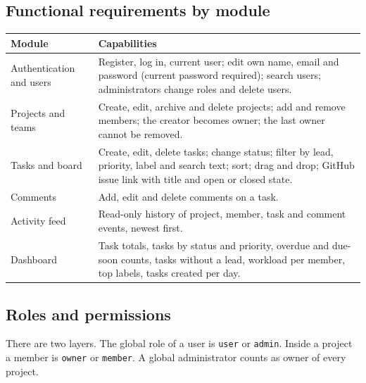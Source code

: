 \documentclass[11pt,a4paper]{article}
\newcommand{\code}[1]{\texttt{#1}}
\begin{document}
\subsection{Functional requirements by module}
\begin{longtable}{@{}p{3.1cm}p{12.4cm}@{}}
\toprule
\textbf{Module} & \textbf{Capabilities}\\
\midrule
\endhead
Authentication and users & Register, log in, current user; edit own name, email and password (current password required); search users; administrators change roles and delete users.\\
Projects and teams & Create, edit, archive and delete projects; add and remove members; the creator becomes owner; the last owner cannot be removed.\\
Tasks and board & Create, edit, delete tasks; change status; filter by lead, priority, label and search text; sort; drag and drop; GitHub issue link with title and open or closed state.\\
Comments & Add, edit and delete comments on a task.\\
Activity feed & Read-only history of project, member, task and comment events, newest first.\\
Dashboard & Task totals, tasks by status and priority, overdue and due-soon counts, tasks without a lead, workload per member, top labels, tasks created per day.\\
\bottomrule
\end{longtable}

\subsection{Roles and permissions}
There are two layers. The global role of a user is \code{user} or \code{admin}. Inside a project a member is \code{owner} or \code{member}. A global administrator counts as owner of every project.
\end{document}
